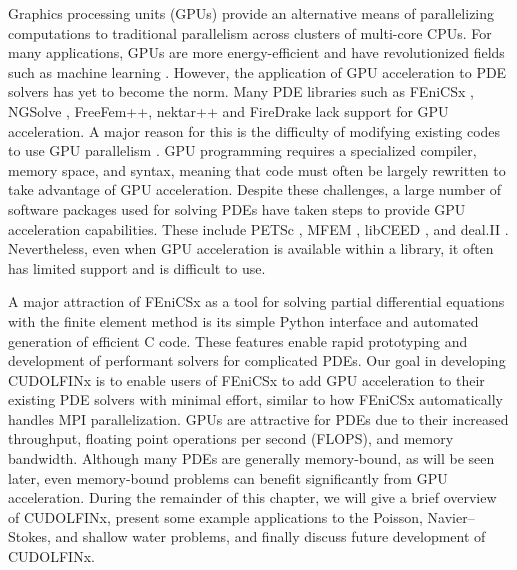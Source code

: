 Graphics processing units (GPUs) provide an alternative means of parallelizing computations to traditional parallelism across clusters of multi-core CPUs. For many applications, GPUs are more energy-efficient and have revolutionized fields such as machine learning \citep{navarro2014survey}. However, the application of GPU acceleration to PDE solvers has yet to become the norm. Many PDE libraries such as FEniCSx \citep{baratta2023dolfinx}, NGSolve \citep{schoberl2014c++}, FreeFem++\citep{hecht2012new}, nektar++ \citep{moxey2020nektar++} and FireDrake \citep{FiredrakeUserManual} lack support for GPU acceleration. A major reason for this is the difficulty of modifying existing codes to use GPU parallelism \citep{MILLS2021102831}. GPU programming requires a specialized compiler, memory space, and syntax, meaning that code must often be largely rewritten to take advantage of GPU acceleration. Despite these challenges, a large number of software packages used for solving PDEs have taken steps to provide GPU acceleration capabilities. These include PETSc \citep{MILLS2021102831}, MFEM \citep{anderson2021mfem}, libCEED \citep{abdelfattah2021gpu}, and deal.II \citep{arndt2021deal}. Nevertheless, even when GPU acceleration is available within a library, it often has limited support and is difficult to use.

A major attraction of FEniCSx \citep{baratta2023dolfinx} as a tool for solving partial differential equations with the finite element method is its simple Python interface and automated generation of efficient C code. These features enable rapid prototyping and development of performant solvers for complicated PDEs. Our goal in developing CUDOLFINx is to enable users of FEniCSx to add GPU acceleration to their existing PDE solvers with minimal effort, similar to how FEniCSx automatically handles MPI parallelization. GPUs are attractive for PDEs due to their increased throughput, floating point operations per second (FLOPS), and memory bandwidth. Although many PDEs are generally memory-bound, as will be seen later, even memory-bound problems can benefit significantly from GPU acceleration. During the remainder of this chapter, we will give a brief overview of CUDOLFINx, present some example applications to the Poisson, Navier--Stokes, and shallow water problems, and finally discuss future development of CUDOLFINx.

